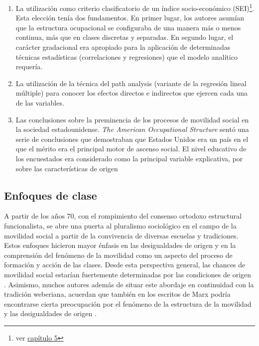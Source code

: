 \documentclass[
]{book}
\begin{document}
\begin{enumerate}
\def\labelenumi{\arabic{enumi}.}
\item
  La utilización como criterio clasificatorio de un índice socio-económico (SEI)\footnote{ver \protect\hyperlink{propuestas-gradacionales}{capítulo 5}}. Esta elección tenía dos fundamentos. En primer lugar, los autores asumían que la estructura ocupacional se configuraba de una manera más o menos continua, más que en clases discretas y separadas. En segundo lugar, el carácter gradacional era apropiado para la aplicación de determinadas técnicas estadísticas (correlaciones y regresiones) que el modelo analítico requería.
\item
  La utilización de la técnica del path analysis (variante de la regresión lineal múltiple) para conocer los efectos directos e indirectos que ejercen cada una de las variables.
\item
  Las conclusiones sobre la preminencia de los procesos de movilidad social en la sociedad estadounidense. \emph{The American Occupational Structure} sentó una serie de conclusiones que demostraban que Estados Unidos era un país en el que el mérito era el principal motor de ascenso social. El nivel educativo de los encuestados era considerado como la principal variable explicativa, por sobre las características de origen \citep[pp.~155,169-170]{Blau.Duncan1967}
\end{enumerate}

\hypertarget{enfoques-de-clase}{%
\subsection{Enfoques de clase}\label{enfoques-de-clase}}

A partir de los años 70, con el rompimiento del consenso ortodoxo estructural funcionalista, se abre una puerta al pluralismo sociológico en el campo de la movilidad social a partir de la convivencia de diversas escuelas y tradiciones. Estos enfoques hicieron mayor énfasis en las desigualdades de origen y en la comprensión del fenómeno de la movilidad como un aspecto del proceso de formación y acción de las clases. Desde esta perspectiva general, las chances de movilidad social estarían fuertemente determinadas por las condiciones de origen \citep[pp.~156]{Kerbo2003}. Asimismo, muchos autores además de situar este abordaje en continuidad con la tradición weberiana, acuerdan que también en los escritos de Marx podría encontrarse cierta preocupación por el fenómeno de la estructura de la movilidad y las desigualdades de origen \citep[pp.~155]{Kerbo2003}.
\end{document}
